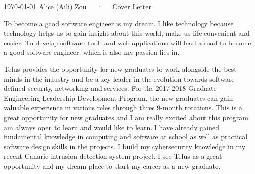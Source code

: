 \documentclass[11pt, a4paper]{awesome-cv}
\begin{document}
\makecvheader[R]

\makecvfooter
  {\today}
  {Alice (Aili) Zou~~~·~~~Cover Letter}
  {}

\makelettertitle

\begin{cvletter}

To become a good software engineer is my dream. I like technology because technology helps us to gain insight about this world,
make us life convenient and easier. To develop software tools and web applications will lead a road to become a good software
engineer, which is also my passion lies in.

Telus provides the opportunity for new graduates to work alongside the best minds in the industry and be a key leader in the
evolution towards software-defined security, networking and services. For the 2017-2018 Graduate Engineering Leadership Development
Program, the new graduates can gain valuable experience in various roles through three 9-month rotations. This is a great
opportunity for new graduates and I am really excited about this program.
am always open to learn and would like to learn. I have already gained fundamental knowledge in computing and software at
school as well as practical software design skills in the projects. I build my cybersecurity knowledge in my recent Canarie intrusion
detection system project. I see Telus as a great opportunity and my dream place to start my career as a new graduate.


\end{cvletter}


\makeletterclosing
\end{document}
